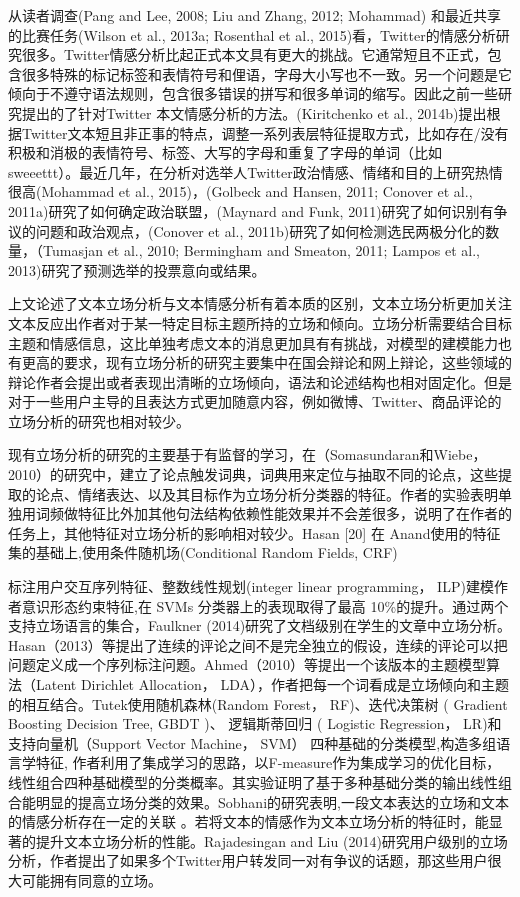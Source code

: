 从读者调查(Pang and Lee, 2008; Liu and Zhang, 2012; Mohammad) 和最近共享的比赛任务(Wilson et al., 2013a; Rosenthal et al., 2015)看，Twitter的情感分析研究很多。Twitter情感分析比起正式本文具有更大的挑战。它通常短且不正式，包含很多特殊的标记标签和表情符号和俚语，字母大小写也不一致。另一个问题是它倾向于不遵守语法规则，包含很多错误的拼写和很多单词的缩写。因此之前一些研究提出的了针对Twitter 本文情感分析的方法。(Kiritchenko et al., 2014b)提出根据Twitter文本短且非正事的特点，调整一系列表层特征提取方式，比如存在/没有积极和消极的表情符号、标签、大写的字母和重复了字母的单词（比如sweeettt）。最近几年，在分析对选举人Twitter政治情感、情绪和目的上研究热情很高(Mohammad et al., 2015)，(Golbeck and Hansen, 2011; Conover et al., 2011a)研究了如何确定政治联盟，(Maynard and Funk, 2011)研究了如何识别有争议的问题和政治观点，(Conover et al., 2011b)研究了如何检测选民两极分化的数量，（Tumasjan et al., 2010; Bermingham and Smeaton, 2011; Lampos et al., 2013)研究了预测选举的投票意向或结果。


上文论述了文本立场分析与文本情感分析有着本质的区别，文本立场分析更加关注文本反应出作者对于某一特定目标主题所持的立场和倾向。立场分析需要结合目标主题和情感信息，这比单独考虑文本的消息更加具有有挑战，对模型的建模能力也有更高的要求，现有立场分析的研究主要集中在国会辩论和网上辩论，这些领域的辩论作者会提出或者表现出清晰的立场倾向，语法和论述结构也相对固定化。但是对于一些用户主导的且表达方式更加随意内容，例如微博、Twitter、商品评论的立场分析的研究也相对较少。

现有立场分析的研究的主要基于有监督的学习，在（Somasundaran和Wiebe，2010）的研究中，建立了论点触发词典，词典用来定位与抽取不同的论点，这些提取的论点、情绪表达、以及其目标作为立场分析分类器的特征。作者的实验表明单独用词频做特征比外加其他句法结构依赖性能效果并不会差很多，说明了在作者的任务上，其他特征对立场分析的影响相对较少。Hasan [20] 在 Anand使用的特征集的基础上,使用条件随机场(Conditional Random Fields, CRF)

标注用户交互序列特征、整数线性规划(integer linear programming， ILP)建模作者意识形态约束特征,在 SVMs 分类器上的表现取得了最高 10\%的提升。通过两个支持立场语言的集合，Faulkner (2014)研究了文档级别在学生的文章中立场分析。Hasan（2013）等提出了连续的评论之间不是完全独立的假设，连续的评论可以把问题定义成一个序列标注问题。Ahmed（2010）等提出一个该版本的主题模型算法（Latent Dirichlet Allocation， LDA），作者把每一个词看成是立场倾向和主题的相互结合。Tutek使用随机森林(Random Forest， RF)、迭代决策树 ( Gradient Boosting Decision Tree, GBDT )、 逻辑斯蒂回归 ( Logistic Regression， LR)和 支持向量机（Support Vector Machine， SVM） 四种基础的分类模型,构造多组语言学特征, 作者利用了集成学习的思路，以F-measure作为集成学习的优化目标，线性组合四种基础模型的分类概率。其实验证明了基于多种基础分类的输出线性组合能明显的提高立场分类的效果。Sobhani的研究表明,一段文本表达的立场和文本的情感分析存在一定的关联 。若将文本的情感作为文本立场分析的特征时，能显著的提升文本立场分析的性能。Rajadesingan and Liu (2014)研究用户级别的立场分析，作者提出了如果多个Twitter用户转发同一对有争议的话题，那这些用户很大可能拥有同意的立场。

